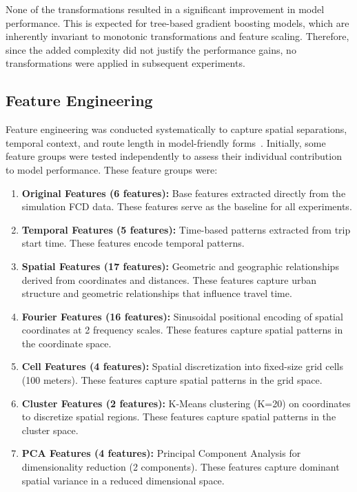 None of the transformations resulted in a significant improvement in model performance.
This is expected for tree-based gradient boosting models, which are inherently invariant to monotonic transformations and feature scaling.
Therefore, since the added complexity did not justify the performance gains, no transformations were applied in subsequent experiments.

\subsection{Feature Engineering}
Feature engineering was conducted systematically to capture spatial separations, temporal context, and route length in model-friendly forms~\cite{lloyd1982least, jolliffe1986pca}.
Initially, some feature groups were tested independently to assess their individual contribution to model performance.
These feature groups were:

\begin{enumerate}
    \item \textbf{Original Features (6 features):} Base features extracted directly from the simulation FCD data.
        These features serve as the baseline for all experiments.

    \item \textbf{Temporal Features (5 features):} Time-based patterns extracted from trip start time.
        These features encode temporal patterns.

    \item \textbf{Spatial Features (17 features):} Geometric and geographic relationships derived from coordinates and distances.
        These features capture urban structure and geometric relationships that influence travel time.

    \item \textbf{Fourier Features (16 features):} Sinusoidal positional encoding of spatial coordinates at 2 frequency scales.
        These features capture spatial patterns in the coordinate space.

    \item \textbf{Cell Features (4 features):} Spatial discretization into fixed-size grid cells (100 meters).
        These features capture spatial patterns in the grid space.

    \item \textbf{Cluster Features (2 features):} K-Means clustering (K=20) on coordinates to discretize spatial regions.
        These features capture spatial patterns in the cluster space.

    \item \textbf{PCA Features (4 features):} Principal Component Analysis for dimensionality reduction (2 components).
        These features capture dominant spatial variance in a reduced dimensional space.

\end{enumerate}

